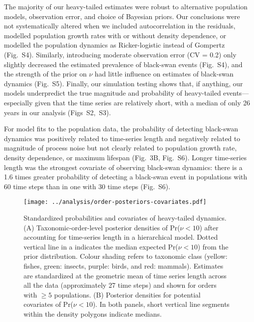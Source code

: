 \documentclass[9pt,twocolumn,twoside]{pnas-new}
\newcommand{\figsimnu}{{2}}
\newcommand{\figsimprob}{{3}}
\newcommand{\figalt}{{4}}
\newcommand{\figaltpriors}{{5}}
\newcommand{\figcorrelates}{{6}}
\begin{document}
The majority of our heavy-tailed estimates were robust to alternative
population models, observation error, and choice of Bayesian priors. Our
conclusions were not systematically altered when we included autocorrelation
in the residuals, modelled population growth rates with or without
density dependence, or modelled the population dynamics as Ricker-logistic
instead of Gompertz (Fig.~S\figalt). Similarly, introducing moderate
observation error (CV = 0.2) only slightly decreased the estimated prevalence
of black-swan events (Fig.~S\figalt), and the strength of the prior on
\(\nu\) had little influence on estimates of black-swan dynamics
(Fig.~S\figaltpriors). Finally, our simulation testing shows that, if
anything, our models underpredict the true magnitude and probability of
heavy-tailed events---especially given that the time series are relatively short,
with a median of only 26
years in our analysis (Figs~S\figsimnu,~S\figsimprob).


For model fits to the population data, the probability of detecting black-swan
dynamics was positively related to time-series length and negatively related to
magnitude of process noise but not clearly related to population growth rate,
density dependence, or maximum lifespan (Fig.~3B, Fig.~S\figcorrelates).
Longer time-series length was the strongest covariate of observing black-swan
dynamics: there is a 1.6 times greater probability of detecting a black-swan
event in populations with 60 time steps than in one with 30 time steps
(Fig.~S\figcorrelates).

\begin{figure}[htb]
\centering
\texttt{[image: ../analysis/order-posteriors-covariates.pdf]}
\caption{Standardized probabilities and covariates of heavy-tailed
dynamics. (A) Taxonomic-order-level posterior densities of Pr(\(\nu
< 10\)) after accounting for time-series length in a hierarchical model. Dotted
vertical line in a indicates the median expected Pr(\(\nu < 10\)) from the
prior distribution. Colour shading refers to taxonomic class (yellow: fishes,
green: insects, purple: birds, and red: mammals). Estimates are standardized at
the geometric mean of time series length across all the data (approximately 27
time steps) and shown for orders with \(\ge 5\) populations. (B)
Posterior densities for potential covariates of Pr(\(\nu < 10\)). In both
panels, short vertical line segments within the density polygons indicate
medians.
}
\label{fig:3}
\end{figure}
\end{document}
